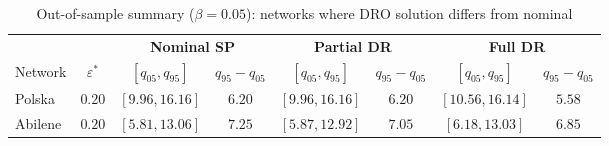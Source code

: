\begin{table}[htbp]
\centering
\caption{Out-of-sample summary ($\beta=0.05$): networks where DRO solution differs from nominal}
\label{tab:oos-summary-beta005}
\small
\setlength{\tabcolsep}{6pt}
\begin{tabular}{l c cc cc cc}
\toprule
& & \multicolumn{2}{c}{\textbf{Nominal SP}} & \multicolumn{2}{c}{\textbf{Partial DR}} & \multicolumn{2}{c}{\textbf{Full DR}} \\
\cmidrule(lr){3-4} \cmidrule(lr){5-6} \cmidrule(lr){7-8}
Network & $\varepsilon^{*}$ & $[q_{05}, q_{95}]$ & $q_{95} \!-\! q_{05}$ & $[q_{05}, q_{95}]$ & $q_{95} \!-\! q_{05}$ & $[q_{05}, q_{95}]$ & $q_{95} \!-\! q_{05}$ \\
\midrule
Polska & $0.20$ & $[9.96, 16.16]$ & $6.20$ & $[9.96, 16.16]$ & $6.20$ & $[10.56, \mathbf{16.14}]$ & $\mathbf{5.58}$ \\
Abilene & $0.20$ & $[5.81, 13.06]$ & $7.25$ & $[5.87, \mathbf{12.92}]$ & $7.05$ & $[6.18, 13.03]$ & $\mathbf{6.85}$ \\
\bottomrule
\end{tabular}
\end{table}
